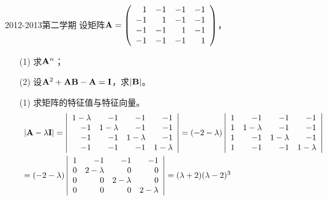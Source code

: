 \begin{frame}
\begin{scriptsize}
\begin{exampleblock}{2012-2013第二学期}
设矩阵$\mathbf{A}=\left(
\begin{array}{rrrr}
1&-1&-1&-1\\
-1&1&-1&-1\\
-1&-1&1&-1\\
-1&-1&-1&1
\end{array}
\right)$，
\begin{itemize}
\item[(1)] 求$\mathbf{A}^n$；
\item[(2)] 设$\mathbf{A}^2+\mathbf{A}\mathbf{B}-\mathbf{A}=\mathbf{I}$，求$|\mathbf{B}|$。
\end{itemize}
\end{exampleblock}
\pause\jiename
\begin{itemize}
\item[(1)] 求矩阵的特征值与特征向量。
  $$
  \begin{array}{l}
    |\mathbf{A}-\lambda\mathbf{I}|=\left|
    \begin{array}{rrrr}
      1-\lambda&-1&-1&-1\\
      -1&1-\lambda&-1&-1\\
      -1&-1&1-\lambda&-1\\
      -1&-1&-1&1-\lambda
    \end{array}
    \right|
    =(-2-\lambda)\left|
    \begin{array}{rrrr}
      1&-1&-1&-1\\
      1&1-\lambda&-1&-1\\
      1&-1&1-\lambda&-1\\
      1&-1&-1&1-\lambda
    \end{array}
    \right|\\[0.3in]=(-2-\lambda)\left|
    \begin{array}{rrrr}
      1&-1&-1&-1\\
      0&2-\lambda&0&0\\
      0&0& 2-\lambda&0\\
      0&0& 0 &2-\lambda
    \end{array}
    \right|   = (\lambda+2)(\lambda-2)^3
  \end{array}
$$
\end{itemize}
\end{scriptsize}
\end{frame}



